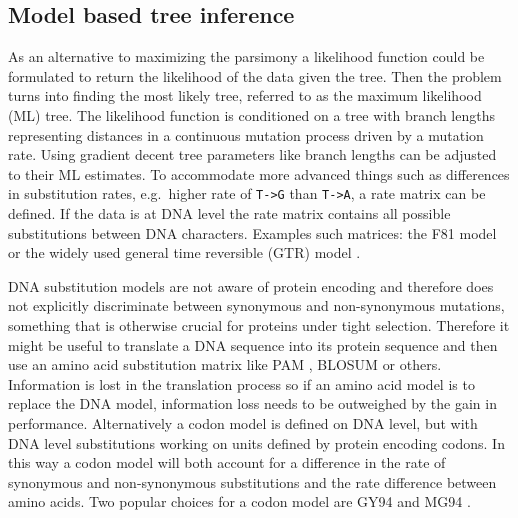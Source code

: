 \subsection{Model based tree inference}
As an alternative to maximizing the parsimony a likelihood function could be formulated to return the likelihood of the data given the tree. Then the problem turns into finding the most likely tree, referred to as the maximum likelihood (ML) tree.
The likelihood function is conditioned on a tree with branch lengths representing distances in a continuous mutation process driven by a mutation rate.%
Using gradient decent tree parameters like branch lengths can be adjusted to their ML estimates.
To accommodate more advanced things such as differences in substitution rates, e.g.\ higher rate of \texttt{T->G} than \texttt{T->A}, a rate matrix can be defined.
If the data is at DNA level the rate matrix contains all possible substitutions between DNA characters.
Examples such matrices: the F81 model \cite{felsenstein1981evolutionary} or the widely used general time reversible (GTR) model \cite{tavare1986some}.

DNA substitution models are not aware of protein encoding and therefore does not explicitly discriminate between synonymous and non-synonymous mutations, something that is otherwise crucial for proteins under tight selection.
Therefore it might be useful to translate a DNA sequence into its protein sequence and then use an amino acid substitution matrix like PAM \cite{dayhoff197822}, BLOSUM \cite{henikoff1992amino} or others.
Information is lost in the translation process so if an amino acid model is to replace the DNA model, information loss needs to be outweighed by the gain in performance.
Alternatively a codon model is defined on DNA level, but with DNA level substitutions working on units defined by protein encoding codons.
In this way a codon model will both account for a difference in the rate of synonymous and non-synonymous substitutions and the rate difference between amino acids.
Two popular choices for a codon model are GY94 \cite{goldman1994codon} and MG94 \cite{muse1994likelihood}.



